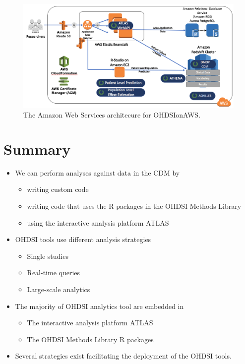 \documentclass[11pt]{book}
\providecommand{\tightlist}{%
  \setlength{\itemsep}{0pt}\setlength{\parskip}{0pt}}
\theoremstyle{definition}
\theoremstyle{definition}
\theoremstyle{definition}
\theoremstyle{remark}
\let\BeginKnitrBlock\begin \let\EndKnitrBlock\end
\begin{document}
\begin{figure}

{\centering \includegraphics[width=1\linewidth]{images/OhdsiAnalyticsTools/OHDSIonAWSDiagram} 

}

\caption{The Amazon Web Services architecure for OHDSIonAWS.}\label{fig:ohdsionawsDiagram}
\end{figure}

\section{Summary}\label{summary-3}

\BeginKnitrBlock{rmdsummary}
\begin{itemize}
\tightlist
\item
  We can perform analyses against data in the CDM by

  \begin{itemize}
  \tightlist
  \item
    writing custom code
  \item
    writing code that uses the R packages in the OHDSI Methods Library
  \item
    using the interactive analysis platform ATLAS
  \end{itemize}
\item
  OHDSI tools use different analysis strategies

  \begin{itemize}
  \tightlist
  \item
    Single studies
  \item
    Real-time queries
  \item
    Large-scale analytics
  \end{itemize}
\item
  The majority of OHDSI analytics tool are embedded in

  \begin{itemize}
  \tightlist
  \item
    The interactive analysis platform ATLAS
  \item
    The OHDSI Methods Library R packages
  \end{itemize}
\item
  Several strategies exist facilitating the deployment of the OHDSI
  tools.
\end{itemize}
\EndKnitrBlock{rmdsummary}
\end{document}
